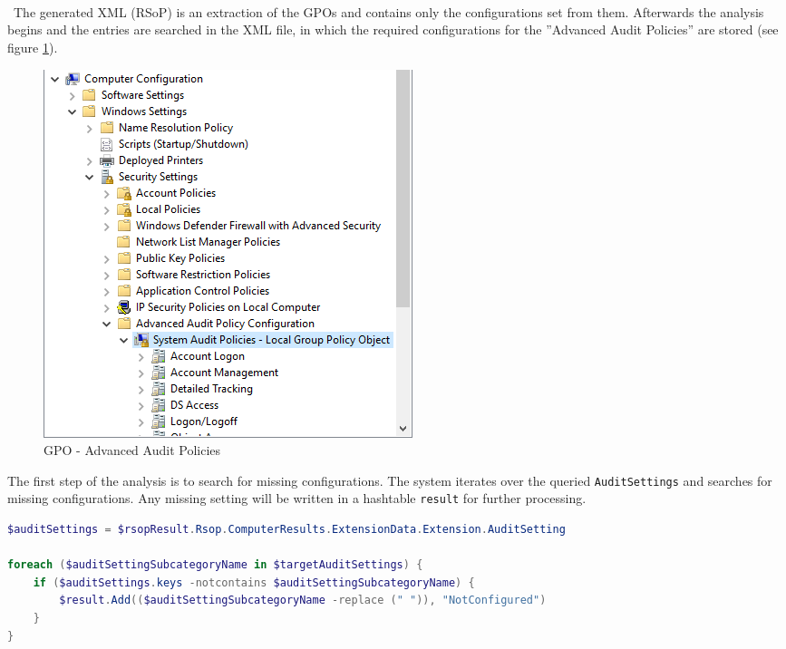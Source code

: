 \begin{multicols}{2}
    \ \\\\\\ \
    The generated XML (RSoP) is an extraction of the GPOs and contains only the configurations set from them.
    Afterwards the analysis begins and the entries are searched in the XML file, in which the required configurations for the ''Advanced Audit Policies'' are stored (see figure \ref{fig:AdvancedAuditPolicies}).
    \begin{figure}[H]
        \centering
        \includegraphics[width=0.7\linewidth]{assets/GetAndCheckAuditPolicies/advancedauditpolicies.png}
        \caption{GPO - Advanced Audit Policies}\label{fig:AdvancedAuditPolicies}
    \end{figure}
\end{multicols}
The first step of the analysis is to search for missing configurations. The system iterates over the queried \lstinline|AuditSettings| and searches for missing configurations. Any missing setting will be written in a hashtable \lstinline|result| for further processing.
\begin{lstlisting}[caption=GetAndCheckAuditPolicies: Search missing configurations, language=PowerShell]
$auditSettings = $rsopResult.Rsop.ComputerResults.ExtensionData.Extension.AuditSetting

foreach ($auditSettingSubcategoryName in $targetAuditSettings) {
    if ($auditSettings.keys -notcontains $auditSettingSubcategoryName) {
        $result.Add(($auditSettingSubcategoryName -replace (" ")), "NotConfigured")
    }
}
\end{lstlisting}

